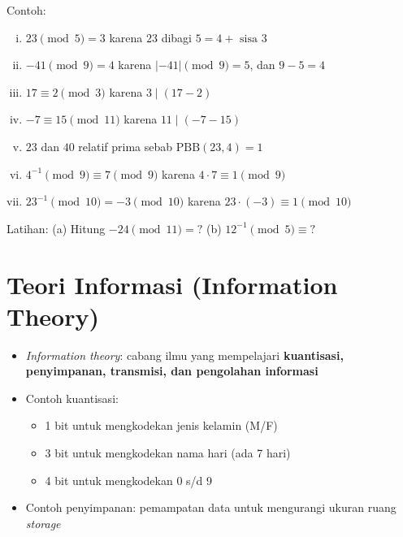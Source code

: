 \documentclass{article}
\begin{document}
\newpage


Contoh:
\begin{enumerate}[(i)]
  \item $23 \pmod{5} = 3$ karena $23$ dibagi $5 = 4 + \text{ sisa } 3$
  \item $-41 \pmod{9} = 4$ karena $|-41| \pmod{9} = 5$, dan $9 - 5 = 4$
  \item $17 \equiv 2 \pmod{3}$ karena $3 \mid (17 - 2)$
  \item $-7 \equiv 15 \pmod{11}$ karena $11 \mid (-7 - 15)$
  \item $23$ dan $40$ relatif prima sebab $\text{PBB}(23, 4) = 1$
  \item $4^{-1} \pmod{9} \equiv 7 \pmod{9}$ karena $4 \cdot 7 \equiv 1 \pmod{9}$
  \item $23^{-1} \pmod{10} = -3 \pmod{10}$ karena $23 \cdot (-3) \equiv 1 \pmod{10}$
\end{enumerate}

Latihan: (a) Hitung $-24 \pmod{11} = ?$
(b) $12^{-1} \pmod{5} \equiv ?$

\newpage


\section*{Teori Informasi (Information Theory)}

\begin{itemize}
    \item \textit{Information theory}: cabang ilmu yang mempelajari \textbf{kuantisasi, penyimpanan, transmisi, dan pengolahan informasi}
    \item Contoh kuantisasi:
    \begin{itemize}
        \item 1 bit untuk mengkodekan jenis kelamin (M/F)
        \item 3 bit untuk mengkodekan nama hari (ada 7 hari)
        \item 4 bit untuk mengkodekan 0 s/d 9
    \end{itemize}
    \item Contoh penyimpanan: pemampatan data untuk mengurangi ukuran ruang \textit{storage}
\end{itemize}

\newpage

\end{document}
